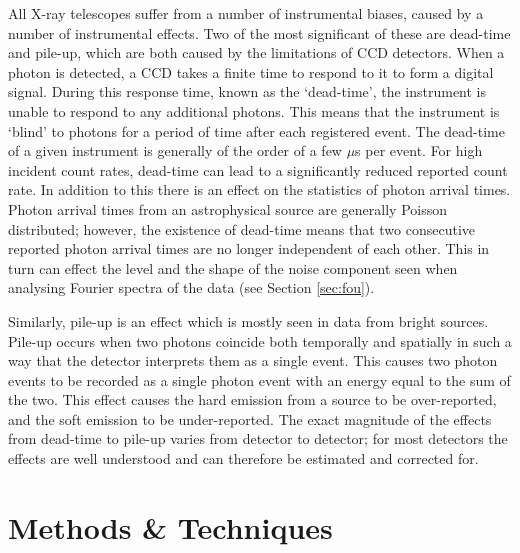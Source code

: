 \par All X-ray telescopes suffer from a number of instrumental biases, caused by a number of instrumental effects.  Two of the most significant of these are dead-time and pile-up, which are both caused by the limitations of CCD detectors.  When a photon is detected, a CCD takes a finite time to respond to it to form a digital signal.  During this response time, known as the `dead-time', the instrument is unable to respond to any additional photons.  This means that the instrument is `blind' to photons for a period of time after each registered event.  The dead-time of a given instrument is generally of the order of a few $\mu$s per event.  For high incident count rates, dead-time can lead to a significantly reduced reported count rate.  In addition to this there is an effect on the statistics of photon arrival times.  Photon arrival times from an astrophysical source are generally Poisson distributed; however, the existence of dead-time means that two consecutive reported photon arrival times are no longer independent of each other.  This in turn can effect the level and the shape of the noise component seen when analysing Fourier spectra of the data (see Section \ref{sec:fou}).
\par Similarly, pile-up is an effect which is mostly seen in data from bright sources.  Pile-up occurs when two photons coincide both temporally and spatially in such a way that the detector interprets them as a single event.  This causes two photon events to be recorded as a single photon event with an energy equal to the sum of the two.  This effect causes the hard emission from a source to be over-reported, and the soft emission to be under-reported.  The exact magnitude of the effects from dead-time to pile-up varies from detector to detector; for most detectors the effects are well understood and can therefore be estimated and corrected for.

\section{Methods \& Techniques}

\label{sec:tec}

